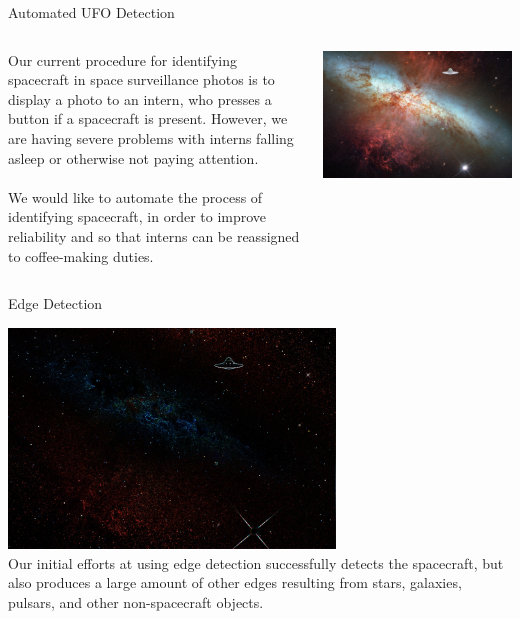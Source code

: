 \documentclass[xcolor=dvipsnames]{beamer}
\begin{document}
	\begin{frame}{Automated UFO Detection}
		\begin{columns}
			\begin{column}{0.5\textwidth}
          Our current procedure for identifying spacecraft in space surveillance photos is to display a photo to an intern, who presses a button if a spacecraft is present. However, we are having severe problems with interns falling asleep or otherwise not paying attention.
          \\~\\
          We would like to automate the process of identifying spacecraft, in order to improve reliability and so that interns can be reassigned to coffee-making duties.
			\end{column}
			\begin{column}{0.5\textwidth}
				\includegraphics[width=\textwidth]{images/original}
			\end{column}
		\end{columns}
	\end{frame}
	
	\begin{frame}[t]{Edge Detection}
		\begin{center}
			\includegraphics[width=0.65\textwidth]{images/edges}
			\\
			Our initial efforts at using edge detection successfully detects the spacecraft, but also produces a large amount of other edges resulting from stars, galaxies, pulsars, and other non-spacecraft objects.
		\end{center}
	\end{frame}
\end{document}
